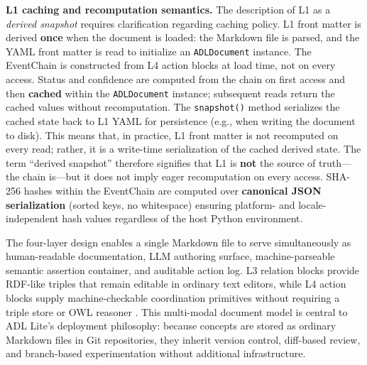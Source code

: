 \textbf{L1 caching and recomputation semantics.} The description of L1 as a \emph{derived snapshot} requires clarification regarding caching policy. L1 front matter is derived \textbf{once} when the document is loaded: the Markdown file is parsed, and the YAML front matter is read to initialize an \texttt{ADLDocument} instance. The EventChain is constructed from L4 action blocks at load time, not on every access. Status and confidence are computed from the chain on first access and then \textbf{cached} within the \texttt{ADLDocument} instance; subsequent reads return the cached values without recomputation. The \texttt{snapshot()} method serializes the cached state back to L1 YAML for persistence (e.g., when writing the document to disk). This means that, in practice, L1 front matter is not recomputed on every read; rather, it is a write-time serialization of the cached derived state. The term ``derived snapshot'' therefore signifies that L1 is \textbf{not} the source of truth---the chain is---but it does not imply eager recomputation on every access. SHA-256 hashes within the EventChain are computed over \textbf{canonical JSON serialization} (sorted keys, no whitespace) ensuring platform- and locale-independent hash values regardless of the host Python environment.

The four-layer design enables a single Markdown file to serve simultaneously as human-readable documentation, LLM authoring surface, machine-parseable semantic assertion container, and auditable action log. L3 relation blocks provide RDF-like triples that remain editable in ordinary text editors, while L4 action blocks supply machine-checkable coordination primitives without requiring a triple store or OWL reasoner \cite{ref17}. This multi-modal document model is central to ADL Lite's deployment philosophy: because concepts are stored as ordinary Markdown files in Git repositories, they inherit version control, diff-based review, and branch-based experimentation without additional infrastructure.

